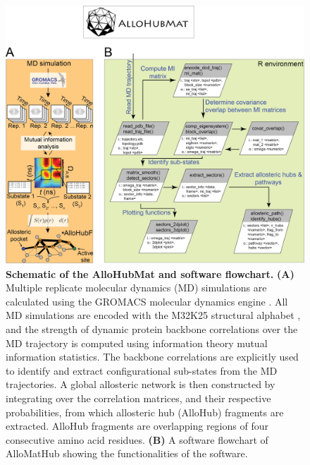 %
%
%
%
%
\begin{figure}[!ht]
\includegraphics[scale=0.7]{ch6_fig9_software_diag.png}
\caption[Schematic of the AlloHubMat and software flowchart.]{\textbf{Schematic of the AlloHubMat and software flowchart.} \textbf{(A)} Multiple replicate molecular dynamics (MD) simulations are calculated using the GROMACS molecular dynamics engine \cite{Van-Der-Spoel:2005aa}. All MD simulations are encoded with the M32K25 structural alphabet \cite{Pandini:2010aa}, and the strength of dynamic protein backbone correlations over the MD trajectory is computed using information theory mutual information statistics. The backbone correlations are explicitly used to identify and extract configurational sub-states from the MD trajectories. A global allosteric network is then constructed by integrating over the correlation matrices, and their respective probabilities, from which allosteric hub (AlloHub) fragments are extracted. AlloHub fragments are overlapping regions of four consecutive amino acid residues. \textbf{(B)} A software flowchart of AlloMatHub showing the functionalities of the software.}
\label{fig:allohubmat_schematic}
\end{figure}
%
%
\clearpage


